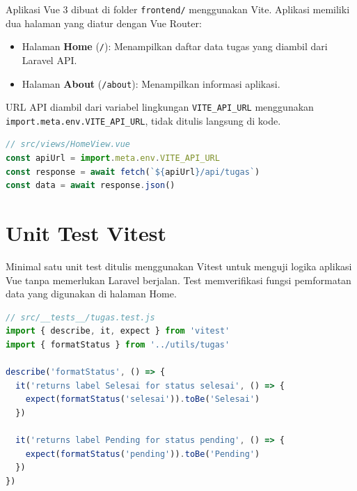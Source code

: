 \documentclass[a4paper,oneside,11pt]{book}
\begin{document}
Aplikasi Vue 3 dibuat di folder \texttt{frontend/} menggunakan Vite. Aplikasi memiliki dua halaman yang diatur dengan Vue Router:
\begin{itemize}
    \item Halaman \textbf{Home} (\texttt{/}): Menampilkan daftar data tugas yang diambil dari Laravel API.
    \item Halaman \textbf{About} (\texttt{/about}): Menampilkan informasi aplikasi.
\end{itemize}

URL API diambil dari variabel lingkungan \texttt{VITE\_API\_URL} menggunakan \texttt{import.meta.env.VITE\_API\_URL}, tidak ditulis langsung di kode.

\begin{lstlisting}[language=javascript, caption={Pengambilan data dari API menggunakan VITE\_API\_URL}]
// src/views/HomeView.vue
const apiUrl = import.meta.env.VITE_API_URL
const response = await fetch(`${apiUrl}/api/tugas`)
const data = await response.json()
\end{lstlisting}



\section{Unit Test Vitest}

Minimal satu unit test ditulis menggunakan Vitest untuk menguji logika aplikasi Vue tanpa memerlukan Laravel berjalan. Test memverifikasi fungsi pemformatan data yang digunakan di halaman Home.

\begin{lstlisting}[language=javascript, caption={Unit test Vitest untuk logika frontend}]
// src/__tests__/tugas.test.js
import { describe, it, expect } from 'vitest'
import { formatStatus } from '../utils/tugas'

describe('formatStatus', () => {
  it('returns label Selesai for status selesai', () => {
    expect(formatStatus('selesai')).toBe('Selesai')
  })

  it('returns label Pending for status pending', () => {
    expect(formatStatus('pending')).toBe('Pending')
  })
})
\end{lstlisting}
\end{document}
